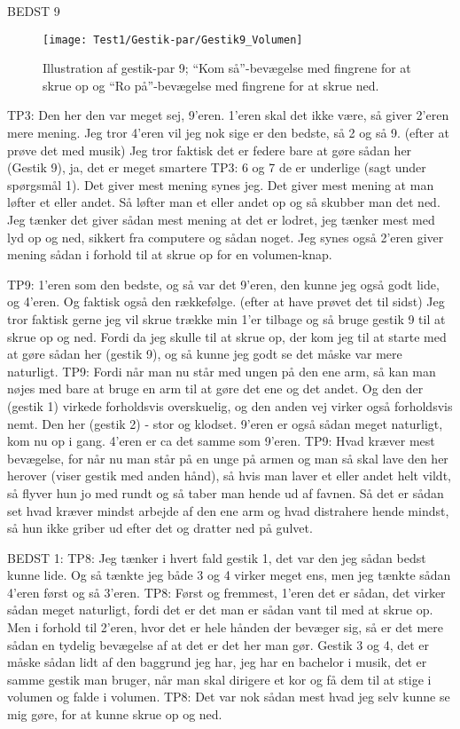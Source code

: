 BEDST 9 
%
\begin{figure}[H]
	\centering
	\texttt{[image: Test1/Gestik-par/Gestik9\_Volumen]}
	\caption{Illustration af gestik-par 9; \enquote{Kom så}-bevægelse med fingrene for at skrue op og \enquote{Ro på}-bevægelse med fingrene for at skrue ned.}
\end{figure}
\noindent
%
TP3: Den her den var meget sej, 9’eren. 1’eren skal det ikke være, så giver 2’eren mere mening. Jeg tror 4’eren vil jeg nok sige er den bedste, så 2 og så 9. (efter at prøve det med musik) Jeg tror faktisk det er federe bare at gøre sådan her (Gestik 9), ja, det er meget smartere
TP3: 6 og 7 de er underlige (sagt under spørgsmål 1). Det giver mest mening synes jeg. Det giver mest mening at man løfter et eller andet. Så løfter man et eller andet op og så skubber man det ned. Jeg tænker det giver sådan mest mening at det er lodret, jeg tænker mest med lyd op og ned, sikkert fra computere og sådan noget. Jeg synes også 2’eren giver mening sådan i forhold til at skrue op for en volumen-knap.

TP9: 1’eren som den bedste, og så var det 9’eren, den kunne jeg også godt lide, og 4’eren. Og faktisk også den rækkefølge. (efter at have prøvet det til sidst) Jeg tror faktisk gerne jeg vil skrue trække min 1’er tilbage og så bruge gestik 9 til at skrue op og ned. Fordi da jeg skulle til at skrue op, der kom jeg til at starte med at gøre sådan her (gestik 9), og så kunne jeg godt se det måske var mere naturligt.
TP9: Fordi når man nu står med ungen på den ene arm, så kan man nøjes med bare at bruge en arm til at gøre det ene og det andet. Og den der (gestik 1) virkede forholdsvis overskuelig, og den anden vej virker også forholdsvis nemt. Den her (gestik 2) - stor og klodset. 9’eren er også sådan meget naturligt, kom nu op i gang. 4’eren er ca det samme som 9’eren. 
TP9: Hvad kræver mest bevægelse, for når nu man står på en unge på armen og man så skal lave den her herover (viser gestik med anden hånd), så hvis man laver et eller andet helt vildt, så flyver hun jo med rundt og så taber man hende ud af favnen. Så det er sådan set hvad kræver mindst arbejde af den ene arm og hvad distrahere hende mindst, så hun ikke griber ud efter det og dratter ned på gulvet. 





BEDST 1:
TP8: Jeg tænker i hvert fald gestik 1, det var den jeg sådan bedst kunne lide. Og så tænkte jeg både 3 og 4 virker meget ens, men jeg tænkte sådan 4’eren først og så 3’eren. 
TP8: Først og fremmest, 1’eren det er sådan, det virker sådan meget naturligt, fordi det er det man er sådan vant til med at skrue op. Men i forhold til 2’eren, hvor det er hele hånden der bevæger sig, så er det mere sådan en tydelig bevægelse af at det er det her man gør. Gestik 3 og 4, det er måske sådan lidt af den baggrund jeg har, jeg har en bachelor i musik, det er samme gestik man bruger, når man skal dirigere et kor og få dem til at stige i volumen og falde i volumen. 
TP8: Det var nok sådan mest hvad jeg selv kunne se mig gøre, for at kunne skrue op og ned. 

